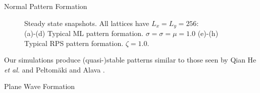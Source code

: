 \documentclass{beamer}
\begin{document}
\begin{frame}{}
\begin{textblock}{0.32}
\begin{block}{Normal Pattern Formation}
\begin{figure}[h]
            \caption{\centering Steady state snapshots. All lattices have $L_x = L_y = 256$: \\ (a)-(d) Typical ML pattern formation. $\sigma = \sigma = \mu = 1.0$  (e)-(h) Typical RPS pattern formation. $\zeta = 1.0$.}
            \label{fig:patterns}
        \end{figure}
        Our simulations produce (quasi-)stable patterns similar to those seen by Qian He \textit{et al.} \cite{he2011} and Peltom{\"a}ki and Alava \cite{peltomaki08}.

    \end{block}
    \hfill
    \begin{block}{Plane Wave Formation}
        \begin{figure}[h]
            \centering
            \\

\end{figure}
\end{block}
\end{textblock}
\end{frame}
\end{document}
